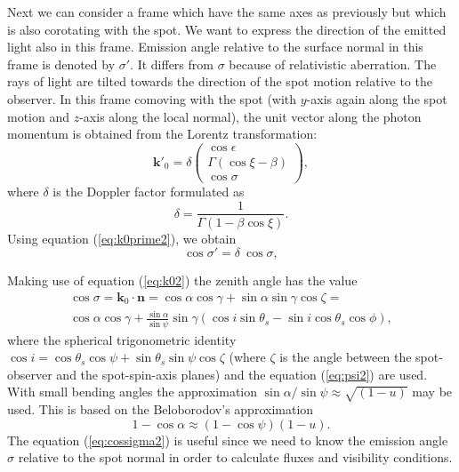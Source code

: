 \documentclass{wihuri}
\def\be{\begin{equation}}
\def\ee{\end{equation}}
\def\Dop{\delta}
\def\thetas{\theta_{s}}
\newcommand{\bmath}[1]{\boldsymbol{#1}}
\begin{document}

Next we can consider a frame which have the same axes as previously but which is also corotating with the spot. We want to express the direction of the emitted light also in this frame. Emission angle relative to the surface normal in this frame is denoted by
$\sigma'$.  It differs from $\sigma$ because of relativistic aberration. The rays of light are tilted towards the direction of the spot motion relative to the observer.
In this frame comoving with the spot 
(with $y$-axis again along the spot motion and $z$-axis along the local normal), 
the unit vector along the photon momentum  is 
obtained from the Lorentz transformation: 
\be \label{eq:k0prime2}
\bmath{k}'_{0} = \Dop
\left( \begin{array}{c}
\cos \epsilon \\
\Gamma (\cos\xi-\beta)\\ 
\cos\sigma
\end{array}
\right) ,
\ee 
where $\delta$ is the Doppler factor formulated as
\be \label{eq:dop2}
\Dop=\frac{1}{\Gamma(1-\beta\cos\xi)} .
\ee
Using equation (\ref{eq:k0prime2}), we obtain
\be \label{eq:aberr2}
\cos\sigma' =   \Dop \ \cos\sigma ,
\ee
 
Making use of equation (\ref{eq:k02}) the zenith angle has the value
\be\label{eq:cossigma2}
\begin{split}
\cos\sigma = \bmath{k}_{0}\cdot\bmath{n} = \cos\alpha\cos\gamma+\sin\alpha\sin\gamma\cos\zeta = \\
\cos \alpha  \cos \gamma + \frac{\sin \alpha}{\sin \psi} \sin \gamma (\cos i \sin \thetas - \sin i \cos \thetas \cos \phi),
\end{split}
\ee
where the spherical trigonometric identity $\cos i = \cos\thetas\cos\psi+\sin\thetas\sin\psi\cos\zeta$ (where $\zeta$ is the angle between the spot-observer and the spot-spin-axis planes) and the equation (\ref{eq:psi2}) are used. With small bending angles the approximation $\sin \alpha / \sin \psi \approx \sqrt{(1-u)}$ may be used. This is based on the Beloborodov's approximation  \cite{beloborodov}
\be \label{eq:beloborodov}
1-\cos \alpha \approx (1 - \cos \psi)(1 - u).
\ee
The equation (\ref{eq:cossigma2}) is useful since we need to know the emission angle $\sigma$ relative to the spot normal in order to calculate fluxes and visibility conditions. 
\end{document}
